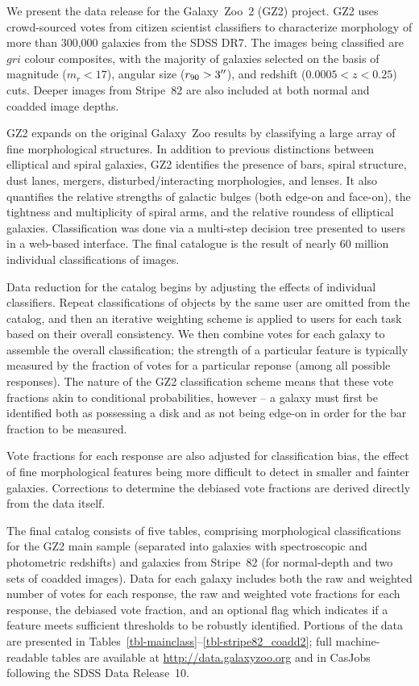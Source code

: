 \documentclass[useAMS,usenatbib]{mn2e}
\begin{document}
We present the data release for the Galaxy~Zoo~2 (GZ2) project. GZ2 uses crowd-sourced votes from citizen scientist classifiers to characterize morphology of more than 300,000 galaxies from the SDSS DR7. The images being classified are $gri$ colour composites, with the majority of galaxies selected on the basis of magnitude ($m_r<17$), angular size ($r_{90}>3\hbox{$^{\prime\prime}$}$), and redshift ($0.0005<z<0.25$) cuts. Deeper images from Stripe~82 are also included at both normal and coadded image depths. 

GZ2 expands on the original Galaxy~Zoo results by classifying a large array of fine morphological structures. In addition to previous distinctions between elliptical and spiral galaxies, GZ2 identifies the presence of bars, spiral structure, dust lanes, mergers, disturbed/interacting morphologies, and lenses. It also quantifies the relative strengths of galactic bulges (both edge-on and face-on), the tightness and multiplicity of spiral arms, and the relative roundess of elliptical galaxies. Classification was done via a multi-step decision tree presented to users in a web-based interface. The final catalogue is the result of nearly 60 million individual classifications of images.

Data reduction for the catalog begins by adjusting the effects of individual classifiers. Repeat classifications of objects by the same user are omitted from the catalog, and then an iterative weighting scheme is applied to users for each task based on their overall consistency. We then combine votes for each galaxy to assemble the overall classification; the strength of a particular feature is typically measured by the fraction of votes for a particular reponse (among all possible responses). The nature of the GZ2 classification scheme means that these vote fractions akin to conditional probabilities, however -- a galaxy must first be identified both as possessing a disk and as not being edge-on in order for the bar fraction to be measured. 

Vote fractions for each response are also adjusted for classification bias, the effect of fine morphological features being more difficult to detect in smaller and fainter galaxies. Corrections to determine the debiased vote fractions are derived directly from the data itself. 

The final catalog consists of five tables, comprising morphological classifications for the GZ2 main sample (separated into galaxies with spectroscopic and photometric redshifts) and galaxies from Stripe~82 (for normal-depth and two sets of coadded images). Data for each galaxy includes both the raw and weighted number of votes for each response, the raw and weighted vote fractions for each response, the debiased vote fraction, and an optional flag which indicates if a feature meets sufficient thresholds to be robustly identified. Portions of the data are presented in Tables~\ref{tbl-mainclass}--\ref{tbl-stripe82_coadd2}; full machine-readable tables are available at \url{http://data.galaxyzoo.org} and in CasJobs following the SDSS Data Release~10. 
\end{document}
